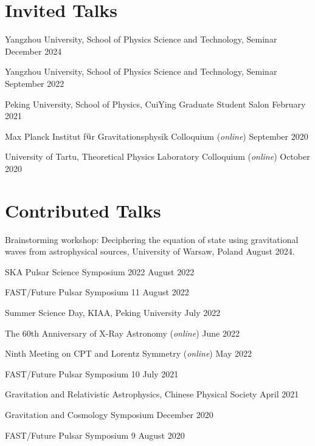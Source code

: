 \newcommand{\playsymbol}{$\blacktriangleright$}
\section{\sc Invited Talks}
\begin{etaremune}
  \item 
  Yangzhou University, School of Physics Science and Technology, Seminar \hfill{} December 2024
  \item 
  Yangzhou University, School of Physics Science and Technology, Seminar
  \hfill{} 
  September 2022
\item 
  Peking University, School of Physics, CuiYing Graduate Student Salon
  \hfill{} 
  February 2021
\item
  Max Planck Institut f$\rm \ddot{u}$r Gravitationsphysik Colloquium ({\it online})
  \hfill{}
  September 2020
\item
  University of Tartu, Theoretical Physics Laboratory Colloquium ({\it online})
  \hfill{}
  October 2020
\end{etaremune}

\section{\sc Contributed Talks}
\begin{etaremune}
\item 
Brainstorming workshop: Deciphering the equation of state using gravitational waves from astrophysical sources, University of Warsaw, Poland \hfill{} August 2024.
\item
  SKA Pulsar Science Symposium 2022
  \hfill{}
  August 2022
\item  
  FAST/Future Pulsar Symposium 11
  \hfill 
  August 2022
\item  
  Summer Science Day, KIAA, Peking University
  \hfill 
  July 2022
\item 
  The 60th Anniversary of X-Ray Astronomy ({\it online})
  \hfill 
  June 2022
\item 
  Ninth Meeting on CPT and Lorentz Symmetry ({\it online})
  \hfill
  May 2022
\item  
  FAST/Future Pulsar Symposium 10
  \hfill 
  July 2021
\item  
  Gravitation and Relativistic Astrophysics, Chinese Physical Society
  \hfill 
  April 2021
\item 
  Gravitation and Cosmology Symposium
  \hfill 
  December 2020
\item 
  FAST/Future Pulsar Symposium 9
  \hfill 
  August 2020
\end{etaremune}


